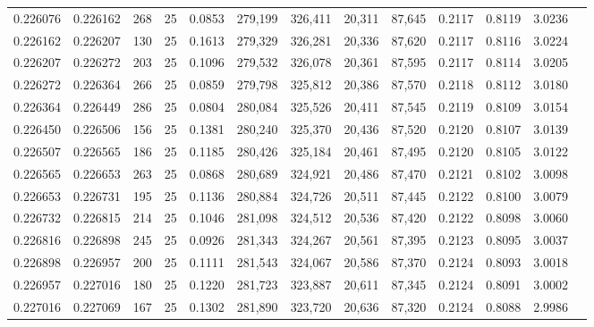 \begin{tabular}{rrrrrrrrrrrrr}
0.226076 & 0.226162 &   268 &  25 &                                     0.0853 & 279,199 & 326,411 &  20,311 &  87,645 & 0.2117 & 0.8119 & 3.0236 \\
0.226162 & 0.226207 &   130 &  25 &                                     0.1613 & 279,329 & 326,281 &  20,336 &  87,620 & 0.2117 & 0.8116 & 3.0224 \\
0.226207 & 0.226272 &   203 &  25 &                                     0.1096 & 279,532 & 326,078 &  20,361 &  87,595 & 0.2117 & 0.8114 & 3.0205 \\
0.226272 & 0.226364 &   266 &  25 &                                     0.0859 & 279,798 & 325,812 &  20,386 &  87,570 & 0.2118 & 0.8112 & 3.0180 \\
0.226364 & 0.226449 &   286 &  25 &                                     0.0804 & 280,084 & 325,526 &  20,411 &  87,545 & 0.2119 & 0.8109 & 3.0154 \\
0.226450 & 0.226506 &   156 &  25 &                                     0.1381 & 280,240 & 325,370 &  20,436 &  87,520 & 0.2120 & 0.8107 & 3.0139 \\
0.226507 & 0.226565 &   186 &  25 &                                     0.1185 & 280,426 & 325,184 &  20,461 &  87,495 & 0.2120 & 0.8105 & 3.0122 \\
0.226565 & 0.226653 &   263 &  25 &                                     0.0868 & 280,689 & 324,921 &  20,486 &  87,470 & 0.2121 & 0.8102 & 3.0098 \\
0.226653 & 0.226731 &   195 &  25 &                                     0.1136 & 280,884 & 324,726 &  20,511 &  87,445 & 0.2122 & 0.8100 & 3.0079 \\
0.226732 & 0.226815 &   214 &  25 &                                     0.1046 & 281,098 & 324,512 &  20,536 &  87,420 & 0.2122 & 0.8098 & 3.0060 \\
0.226816 & 0.226898 &   245 &  25 &                                     0.0926 & 281,343 & 324,267 &  20,561 &  87,395 & 0.2123 & 0.8095 & 3.0037 \\
0.226898 & 0.226957 &   200 &  25 &                                     0.1111 & 281,543 & 324,067 &  20,586 &  87,370 & 0.2124 & 0.8093 & 3.0018 \\
0.226957 & 0.227016 &   180 &  25 &                                     0.1220 & 281,723 & 323,887 &  20,611 &  87,345 & 0.2124 & 0.8091 & 3.0002 \\
0.227016 & 0.227069 &   167 &  25 &                                     0.1302 & 281,890 & 323,720 &  20,636 &  87,320 & 0.2124 & 0.8088 & 2.9986 \\

\end{tabular}
